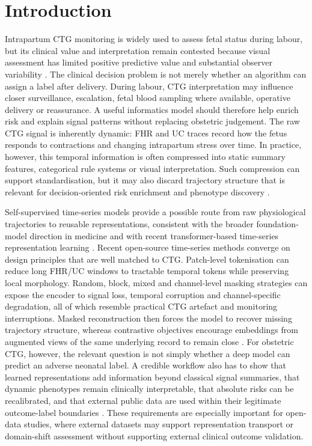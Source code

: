 \documentclass[11pt]{article}
\begin{document}
        \section{Introduction}

Intrapartum CTG monitoring is widely used to assess fetal status during labour, but its clinical value and interpretation remain contested because visual assessment has limited positive predictive value and substantial observer variability \cite{alfirevic2017,figo2015,nichd2008,francis2024}. The clinical decision problem is not merely whether an algorithm can assign a label after delivery. During labour, CTG interpretation may influence closer surveillance, escalation, fetal blood sampling where available, operative delivery or reassurance. A useful informatics model should therefore help enrich risk and explain signal patterns without replacing obstetric judgement. The raw CTG signal is inherently dynamic: FHR and UC traces record how the fetus responds to contractions and changing intrapartum stress over time. In practice, however, this temporal information is often compressed into static summary features, categorical rule systems or visual interpretation. Such compression can support standardisation, but it may also discard trajectory structure that is relevant for decision-oriented risk enrichment and phenotype discovery \cite{mendis2023}.

Self-supervised time-series models provide a possible route from raw physiological trajectories to reusable representations, consistent with the broader foundation-model direction in medicine and with recent transformer-based time-series representation learning \cite{moor2023,zerveas2021,nie2023,yue2022,goswami2024moment}. Recent open-source time-series methods converge on design principles that are well matched to CTG. Patch-level tokenisation can reduce long FHR/UC windows to tractable temporal tokens while preserving local morphology. Random, block, mixed and channel-level masking strategies can expose the encoder to signal loss, temporal corruption and channel-specific degradation, all of which resemble practical CTG artefact and monitoring interruptions. Masked reconstruction then forces the model to recover missing trajectory structure, whereas contrastive objectives encourage embeddings from augmented views of the same underlying record to remain close \cite{nie2023,yue2022,zhang2022tfc}. For obstetric CTG, however, the relevant question is not simply whether a deep model can predict an adverse neonatal label. A credible workflow also has to show that learned representations add information beyond classical signal summaries, that dynamic phenotypes remain clinically interpretable, that absolute risks can be recalibrated, and that external public data are used within their legitimate outcome-label boundaries \cite{tripodai2024,vanCalster2019,vickers2006}. These requirements are especially important for open-data studies, where external datasets may support representation transport or domain-shift assessment without supporting external clinical outcome validation.
\end{document}
